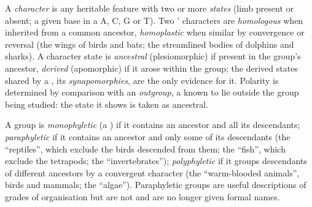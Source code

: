 \begin{definition}\label{def:b1:classifying-biodiversity:characters}
A \emph{character} is any heritable feature with two or more
\emph{states} (limb present or absent; a given base in a  A, C, G
or T). Two ' characters are \emph{homologous} when inherited
from a common ancestor, \emph{homoplastic} when similar by convergence
or reversal (the wings of birds and bats; the streamlined bodies of
dolphins and sharks). A character state is \emph{ancestral}
(plesiomorphic) if present in the group's ancestor, \emph{derived}
(apomorphic) if it arose within the group; the derived states shared
by a , its \emph{synapomorphies}, are the only evidence for it.
Polarity is determined by comparison with an \emph{outgroup}, a 
known to lie outside the group being studied: the state it shows is
taken as ancestral.
\end{definition}

\begin{definition}\label{def:b1:classifying-biodiversity:monophyly}
A group is \emph{monophyletic} (a ) if it contains an ancestor
and all its descendants; \emph{paraphyletic} if it contains an
ancestor and only some of its descendants (the ``reptiles'', which
exclude the birds descended from them; the ``fish'', which exclude the
tetrapods; the ``invertebrates''); \emph{polyphyletic} if it groups
descendants of different ancestors by a convergent character (the
``warm-blooded animals'', birds and mammals; the ``algae''). Paraphyletic
groups are useful descriptions of grades of organisation but are not
 and are no longer given formal names.
\end{definition}

